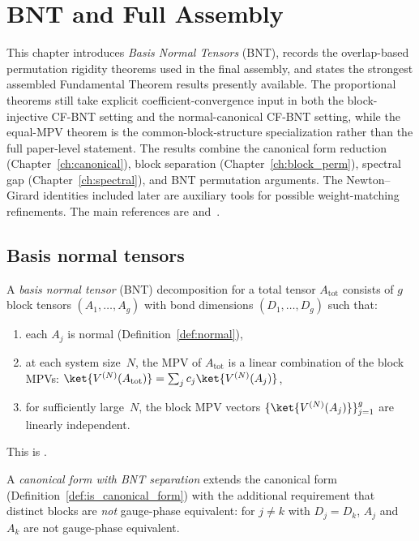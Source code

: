 \chapter{BNT and Full Assembly}\label{ch:assembly}

This chapter introduces \emph{Basis Normal Tensors} (BNT),
records the overlap-based permutation rigidity theorems used in the
final assembly, and states the strongest assembled Fundamental Theorem
results presently available.
The proportional theorems still take explicit coefficient-convergence
input in both the block-injective CF-BNT setting and the normal-canonical
CF-BNT setting, while the equal-MPV theorem is the common-block-structure
specialization rather than the full paper-level statement.
The results combine the canonical form reduction
(Chapter~\ref{ch:canonical}),
block separation (Chapter~\ref{ch:block_perm}),
spectral gap (Chapter~\ref{ch:spectral}),
and BNT permutation arguments. The Newton--Girard identities included
later are auxiliary tools for possible weight-matching refinements.
The main references are
\cite{PerezGarcia2007Matrix} and~\cite{Cirac2021Matrix}.

\section{Basis normal tensors}

\begin{definition}\label{def:bnt}
	\leanok
	A \emph{basis normal tensor} (BNT) decomposition for a
	total tensor $A_{\mathrm{tot}}$ consists of $g$ block tensors
	$(A_1, \ldots, A_g)$ with bond dimensions $(D_1, \ldots, D_g)$
	such that:
	\begin{enumerate}
		\item each $A_j$ is normal
		      (Definition~\ref{def:normal}),
		\item at each system size~$N$, the MPV of $A_{\mathrm{tot}}$
		      is a linear combination of the block MPVs:
		      $\ket{V^{(N)}(A_{\mathrm{tot}})}
			      = \sum_j c_j \ket{V^{(N)}(A_j)}$,
		\item for sufficiently large~$N$, the block MPV
		      vectors $\{\ket{V^{(N)}(A_j)}\}_{j=1}^g$ are
		      linearly independent.
	\end{enumerate}
	This is \cite[Definition~4.2]{Cirac2021Matrix}.
\end{definition}

\begin{definition}\label{def:cf_bnt}
	\leanok
	A \emph{canonical form with BNT separation} extends the canonical form
	(Definition~\ref{def:is_canonical_form})
	with the additional requirement that distinct blocks are
	\emph{not} gauge-phase equivalent:
	for $j \neq k$ with $D_j = D_k$,
	$A_j$ and $A_k$ are not gauge-phase equivalent.
\end{definition}


